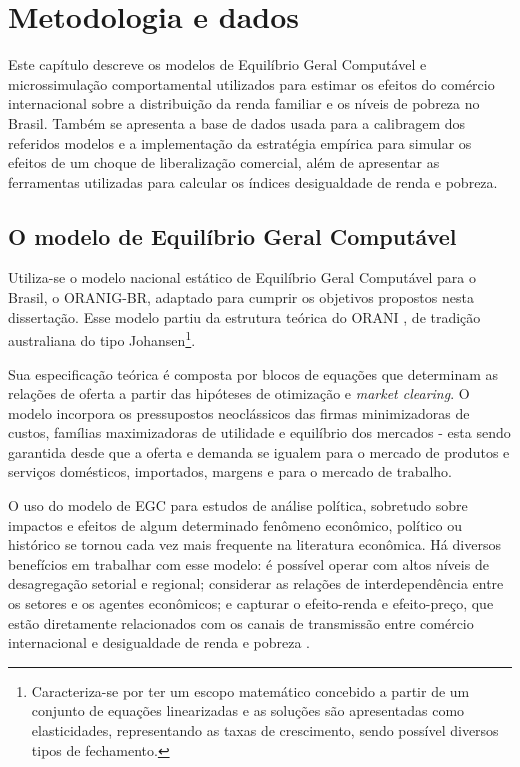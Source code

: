 

\chapter{Metodologia e dados} \label{cha:metodologia}

Este capítulo descreve os modelos de Equilíbrio Geral Computável e microssimulação comportamental utilizados para estimar os efeitos do comércio internacional sobre a distribuição da renda familiar e os níveis de pobreza no Brasil. Também se apresenta a base de dados usada para a calibragem dos referidos modelos e a implementação da estratégia empírica para simular os efeitos de um choque de liberalização comercial, além de apresentar as ferramentas utilizadas para calcular os índices desigualdade de renda e pobreza.


\section{O modelo de Equilíbrio Geral Computável} \label{sec:egc}

Utiliza-se o modelo nacional estático de Equilíbrio Geral Computável para o Brasil, o ORANIG-BR, adaptado para cumprir os objetivos propostos nesta dissertação. Esse modelo partiu da estrutura teórica do ORANI \cite{dixit80}, de tradição australiana do tipo Johansen\footnote{Caracteriza-se por ter um escopo matemático concebido a partir de um conjunto de equações linearizadas e as soluções são apresentadas como elasticidades, representando as taxas de crescimento, sendo possível diversos tipos de fechamento.}.

Sua especificação teórica é composta por blocos de equações que determinam as relações de oferta a partir das hipóteses de otimização e \textit{market clearing}. O modelo incorpora os pressupostos neoclássicos das firmas minimizadoras de custos, famílias maximizadoras de utilidade e equilíbrio dos mercados - esta sendo garantida desde que a oferta e demanda se igualem para o mercado de produtos e serviços domésticos, importados, margens e para o mercado de trabalho.

O uso do modelo de EGC para estudos de análise política, sobretudo sobre impactos e efeitos de algum determinado fenômeno econômico, político ou histórico se tornou cada vez mais frequente na literatura econômica. Há diversos benefícios em trabalhar com esse modelo: é possível operar com altos níveis de desagregação setorial e regional; considerar as relações de interdependência entre os setores e os agentes econômicos; e capturar o efeito-renda e efeito-preço, que estão diretamente relacionados com os canais de transmissão entre comércio internacional e desigualdade de renda e pobreza \cite{anderson20}.


